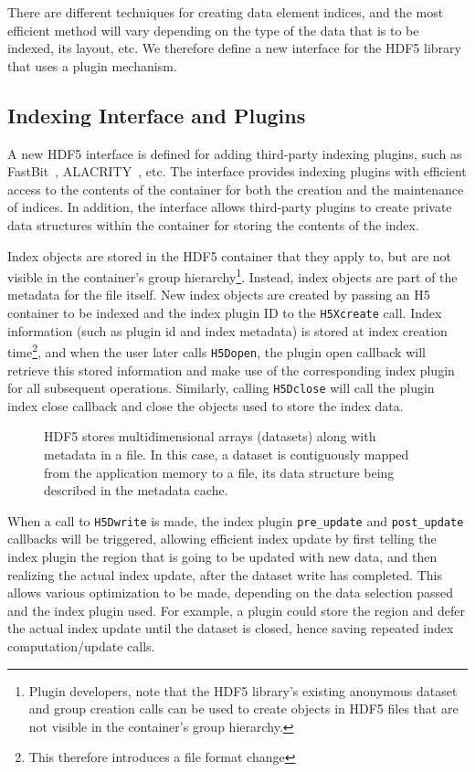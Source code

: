 \documentclass[letterpaper,hyper]{THG_RFC}
\begin{document}
There are different techniques for creating data element indices, and the most
efficient method will vary depending on the type of the data that is to be
indexed, its layout, etc. We therefore define a new interface for the HDF5
library that uses a plugin mechanism.

\subsection{Indexing Interface and Plugins}

A new HDF5 interface is defined for adding third-party indexing plugins,
such as FastBit~\cite{Wu05}, ALACRITY~\cite{alacrity13}, etc.
The interface provides indexing plugins with efficient access to the contents of
the container for both the creation and the maintenance of indices. In addition,
the interface allows third-party plugins to create private data structures
within the container for storing the contents of the index.

Index objects are stored in the HDF5 container that they apply to, but are not
visible in the container's group hierarchy\footnote{Plugin developers, note that
the HDF5 library's existing anonymous dataset and group creation calls can be
used to create objects in HDF5 files that are not visible in the container's
group hierarchy.}.
Instead, index objects are part of the metadata for the file itself. New index
objects are created by passing an H5 container to be indexed and the index
plugin ID to the \texttt{H5Xcreate} call.
Index information (such as plugin id and index metadata) is stored at index
creation time\footnote{This therefore introduces a file format change},
and when the user later calls \texttt{H5Dopen}, the plugin open
callback will retrieve this stored information and make use of the corresponding
index plugin for all subsequent operations. Similarly, calling \texttt{H5Dclose}
will call the plugin index close callback and close the objects used to store
the index data.

\begin{figure}

\caption{HDF5 stores multidimensional arrays (datasets)
  along with metadata in a file. In this case, a dataset is contiguously mapped
  from the application memory to a file, its data structure being described in
  the metadata cache.}
\label{fig:hdf5filestruc}
\end{figure}

When a call to \texttt{H5Dwrite} is made, the index plugin \texttt{pre\_update} and
\texttt{post\_update} callbacks will be triggered, allowing efficient index
update by first telling the index plugin the region that is going to be updated
with new data, and then realizing the actual index update, after the dataset
write has completed. This allows various optimization to be made, depending on
the data selection passed and the index plugin used. For example, a plugin could
store the region and defer the actual index update until the dataset is closed,
hence saving repeated index computation/update calls.
\end{document}
